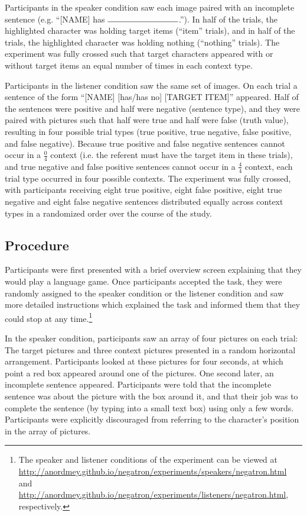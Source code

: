 \documentclass[man, noapacite]{apa2}
\begin{document}
Participants in the speaker condition saw each image paired with an incomplete sentence (e.g. ``[NAME] has $\rule{3cm}{0.15mm}$.''). In half of the trials, the highlighted character was holding target items (``item'' trials), and in half of the trials, the highlighted character was holding nothing (``nothing'' trials).  The experiment was fully crossed such that target characters appeared with or without target items an equal number of times in each context type.  

Participants in the listener condition saw the same set of images.  On each trial a sentence of the form ``[NAME] [has/has no] [TARGET ITEM]'' appeared.  Half of the sentences were positive and half were negative (sentence type), and they were paired with pictures such that half were true and half were false (truth value), resulting in four possible trial types (true positive, true negative, false positive, and false negative).  Because true positive and false negative sentences cannot occur in a $\frac{0}{4}$ context (i.e. the referent must have the target item in these trials), and true negative and false positive sentences cannot occur in a $\frac{4}{4}$ context, each trial type occurred in four possible contexts.  The experiment was fully crossed, with participants receiving eight true positive, eight false positive, eight true negative and eight false negative sentences distributed equally across context types in a randomized order over the course of the study.  

\subsection{Procedure}

Participants were first presented with a brief overview screen explaining that they would play a language game.  Once participants accepted the task, they were randomly assigned to the speaker condition or the listener condition and saw more detailed instructions which explained the task and informed them that they could stop at any time.\footnote{The speaker and listener conditions of the experiment can be viewed at \url{http://anordmey.github.io/negatron/experiments/speakers/negatron.html} and \url{http://anordmey.github.io/negatron/experiments/listeners/negatron.html}, respectively.}

In the speaker condition, participants saw an array of four pictures on each trial: The target pictures and three context pictures presented in a random horizontal arrangement.  Participants looked at these pictures for four seconds, at which point a red box appeared around one of the pictures.  One second later, an incomplete sentence appeared. Participants were told that the incomplete sentence was about the picture with the box around it, and that their job was to complete the sentence (by typing into a small text box) using only a few words. Participants were explicitly discouraged from referring to the character's position in the array of pictures. 
\end{document}
